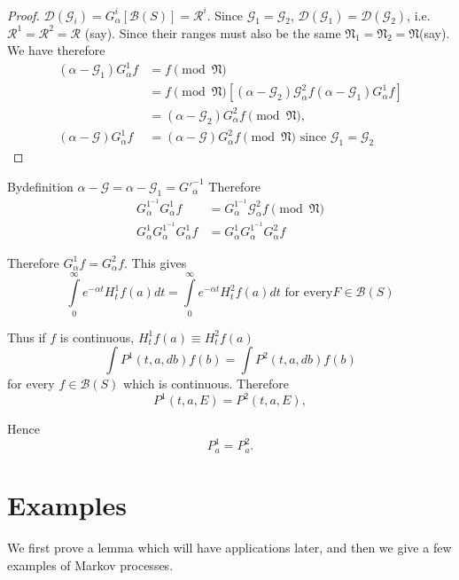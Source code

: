 \begin{proof}
$\mathscr{D} (\mathscr{G}_i) = G^i_\alpha [\mathscr{B} (S) ] =
  \mathscr{R}^i $. Since $\mathscr{G}_1 = \mathscr{G}_2$,
  $\mathscr{D}(\mathscr{G}_1) = \mathscr{D}(\mathscr{G}_2)$,
  i.e. $\mathscr{R}^1 = \mathscr{R}^2= \mathscr{R}$ (say). Since their
  ranges must also be the same $\mathfrak{N}_1 = \mathfrak{N}_2 =
  \mathfrak{N}$(say). We have therefore  
  \begin{align*}
(\alpha - \mathscr{G}_1) G^1_\alpha f &=f \pmod {\mathfrak{N}}\\
    & =f \pmod
    {\mathfrak{N}}[(\alpha-\mathscr{G}_{2})\mathscr{G}^{2}_{\alpha}f(\alpha
      - \mathscr{G}_1) G^1_\alpha f] \\ 
    &= (\alpha - \mathscr{G}_2) G^2_\alpha f  \pmod {\mathfrak{N}},\\ 
    (\alpha - \mathscr{G}) G^1_\alpha f &= (\alpha - \mathscr{G})
    G^2_\alpha f  \pmod {\mathfrak{N}} \text{ since }
    \mathscr{G}_{1}= \mathscr{G}_2 
  \end{align*}
\end{proof}

By\pageoriginale definition $\alpha - \mathscr{G} = \alpha -
\mathscr{G}_1 = G'^{-1}_\alpha$ Therefore 
\begin{align*}
  G^{1^{-1}}_\alpha G^{1}_\alpha f & = G^{1^{-1}}_\alpha \mathscr{G}^{2}_{\alpha}f \pmod {\mathfrak{N}} \\
  G^{1}_\alpha G^{1^{-1}}_\alpha G^{1}_\alpha f & = G^{1}_\alpha
  G^{1^{-1}}_\alpha G^{2}_\alpha f 
\end{align*}

Therefore $G^{1}_\alpha f =  G^{2}_\alpha f$. This gives 
$$
\int\limits_{0}^\infty e^{- \alpha t} H^1_t f(a) dt =
\int\limits_{0}^\infty e^{- \alpha t} H^2_t f(a) dt \text{ for every}
F \in \mathscr{B}(S) 
$$

Thus if $f$ is continuous, $H^1_t f(a) \equiv H^2_t f(a)$
$$
\int P^1 (t,a, db) f(b) = \int P^2 (t,a,db) f(b) 
$$
for every $f \in \mathscr{B} (S)$ which is continuous. Therefore 
$$
P^1 (t,a,E) = P^2 (t,a,E) ,
$$

Hence 
$$
P^1_a = P^2_a.
$$

\section{Examples}\label{chap1-sec7} 

We first prove a lemma which will have applications later, and then we
give a few examples of Markov processes. 

